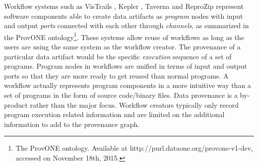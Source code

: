 Workflow systems such as VisTrails \cite{freire2014reproducibility}, Kepler \cite{ludascher2006scientific}, Taverna \cite{wolstencroft2013taverna} and ReproZip \cite{chirigati2013reprozip} represent software components able to create data artifacts as \emph{program} nodes with input and output \emph{ports} connected with each other through \emph{channels}, as summarized in the ProvONE ontology\footnote{The ProvONE ontology. Available at http://purl.dataone.org/provone-v1-dev, accessed on November 18th, 2015.}. These systems allow reuse of workflows as long as the users are using the same system as the workflow creator. The provenance of a particular data artifact would be the specific \emph{execution} sequence of a set of programs. Program nodes in workflows are unified in terms of input and output ports so that they are more ready to get reused than normal programs. A workflow actually represents program components in a more intuitive way than a set of programs in the form of source code/binary files. Data provenance is a by-product rather than the major focus. Workflow creators typically only record program execution related information and are limited on the additional information to add to the provenance graph.


